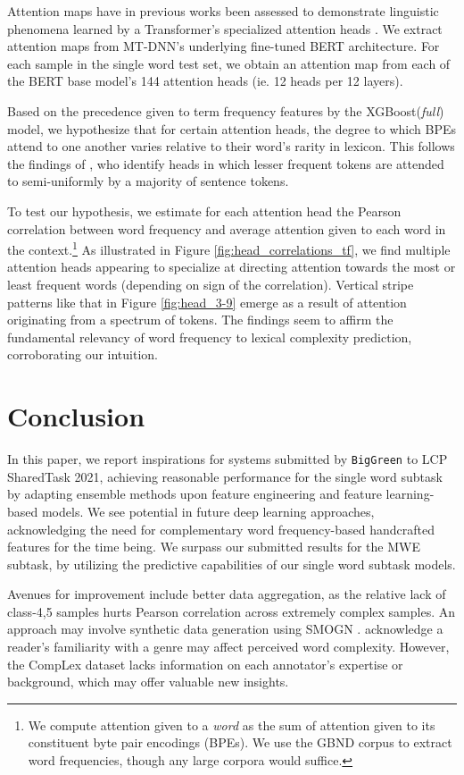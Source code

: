 \documentclass[11pt,a4paper]{article}
\begin{document}
Attention maps have in previous works been assessed to demonstrate linguistic phenomena learned by a Transformer's specialized attention heads \citep{190509418, 190604341}. We extract attention maps from MT-DNN's underlying fine-tuned BERT architecture. For each sample in the single word test set, we obtain an attention map from each of the BERT base model's 144 attention heads (ie. 12 heads per 12 layers).

Based on the precedence given to term frequency features by the XGBoost(\textit{full}) model, we hypothesize that for certain attention heads, the degree to which BPEs attend to one another varies relative to their word's rarity in lexicon. This follows the findings of \citet{190509418}, who identify heads in which lesser frequent tokens are attended to semi-uniformly by a majority of sentence tokens. 

To test our hypothesis, we estimate for each attention head the Pearson correlation between word frequency and average attention given to each word in the context.\footnote{We compute attention given to a \textit{word} as the sum of attention given to its constituent byte pair encodings (BPEs). We use the GBND corpus to extract word frequencies, though any large corpora would suffice.} As illustrated in Figure \ref{fig:head_correlations_tf}, we find multiple attention heads appearing to specialize at directing attention towards the most or least frequent words (depending on sign of the correlation). Vertical stripe patterns like that in Figure \ref{fig:head_3-9} emerge as a result of attention originating from a spectrum of tokens. The findings seem to affirm the fundamental relevancy of word frequency to lexical complexity prediction, corroborating our intuition.

\section{Conclusion}

In this paper, we report inspirations for systems submitted by \texttt{BigGreen} to LCP SharedTask 2021, achieving reasonable performance for the single word subtask by adapting ensemble methods upon feature engineering and feature learning-based models. We see potential in future deep learning approaches, acknowledging the need for complementary word frequency-based handcrafted features for the time being. We surpass our submitted results for the MWE subtask, by utilizing the predictive capabilities of our single word subtask models.

Avenues for improvement include better data aggregation, as the relative lack of class-4,5 samples hurts Pearson correlation across extremely complex samples. An approach may involve synthetic data generation using SMOGN \citep{pmlrv74branco17a}. \citet{shardlow2020complex} acknowledge a reader's familiarity with a genre may affect perceived word complexity. However, the CompLex dataset lacks information on each annotator's expertise or background, which may offer valuable new insights.




\end{document}
